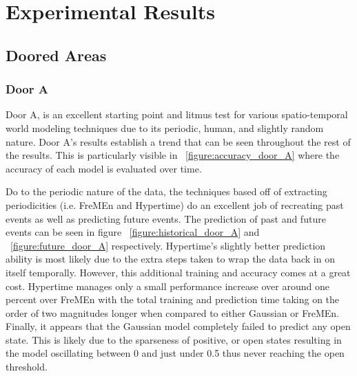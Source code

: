 

\chapter{Experimental Results}

\section{ Doored Areas }

\subsection { Door A }

Door A, is an excellent starting point and litmus test for various spatio-temporal
world modeling techniques due to its periodic, human, and slightly random nature.
Door A's results establish a trend that can be seen
throughout the rest of the results. This is particularly visible in ~\ref{figure:accuracy_door_A}
where the accuracy of each model is evaluated over time. \\

\begin{table}[h!]
  \centering
  \caption{Door A Data Overview}
  \label{table:door_A}
\end{table}

Do to the periodic nature of the data, the techniques based off of extracting
periodicities (i.e. FreMEn and Hypertime) do an excellent job of recreating
past events as well as predicting future events. The prediction of past and future events can be seen in
figure ~\ref{figure:historical_door_A} and ~\ref{figure:future_door_A} respectively. Hypertime's slightly better
prediction ability is most likely due to the extra steps taken to wrap the data back
in on itself temporally. However, this additional training and accuracy comes at a
great cost. Hypertime manages only a small performance increase over
around one percent over FreMEn with the total training and prediction time
taking on the order of two magnitudes longer when compared to either Gaussian or FreMEn.
Finally, it appears that the Gaussian model completely failed to predict any
open state. This is likely due to the sparseness of positive, or open
states resulting in the model oscillating between 0 and just under 0.5 thus
never reaching the open threshold. \\

